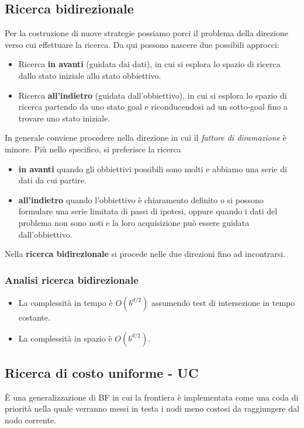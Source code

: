 \subsection{Ricerca bidirezionale}
Per la costruzione di nuove strategie possiamo porci il problema della direzione verso cui
effettuare la ricerca.
Da qui possono nascere due possibili approcci:
\begin{itemize}
	\item Ricerca \textbf{in avanti} (guidata dai dati), in cui si esplora lo spazio di
	      ricerca dallo stato iniziale allo stato obbiettivo.
	\item Ricerca \textbf{all'indietro} (guidata dall'obbiettivo), in cui si esplora lo
	      spazio di ricerca partendo da uno stato goal e riconducendosi ad un sotto-goal
	      fino a trovare uno stato iniziale.
\end{itemize}
In generale conviene procedere nella direzione in cui il \emph{fattore di diramazione}
\`e minore.
Pi\`u nello specifico, si preferisce la ricerca
\begin{itemize}
	\item \textbf{in avanti} quando gli obbiettivi possibili sono molti e abbiamo una
	      serie di dati da cui partire.
	\item \textbf{all'indietro} quando l'obbiettivo \`e chiaramento definito o si possono
	      formulare una serie limitata di passi di ipotesi, oppure quando i dati del
	      problema non sono noti e la loro acquisizione pu\`o essere guidata
	      dall'obbiettivo.
\end{itemize}
Nella \textbf{ricerca bidirezionale} si procede nelle due direzioni fino ad incontrarsi.

\subsubsection{Analisi ricerca bidirezionale}
\begin{itemize}
	\item La complessit\`a in tempo \`e $O(b^{d/2})$ assumendo test di intersezione in
	      tempo costante.
	\item La complessit\`a in spazio \`e $O(b^{d/2})$.
\end{itemize}

\subsection{Ricerca di costo uniforme - UC}
\`E una generalizzazione di BF in cui la frontiera \`e implementata come una coda di priorit\`a nella
quale verranno messi in testa i nodi meno costosi da raggiungere dal nodo corrente.

